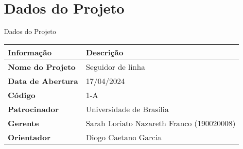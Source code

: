 \section{Dados do Projeto}

\begin{quadro}[htb]
  \caption{\label{quadro_dados_projeto}Dados do Projeto}

  \begin{tabular}{|l|l|}
    \hline
    \textbf{Informação} & \textbf{Descrição} \\
    \hline
    \textbf{Nome do Projeto} & Seguidor de linha \\
    \hline
    \textbf{Data de Abertura} & 17/04/2024 \\
    \hline
    \textbf{Código} & 1-A \\
    \hline
    \textbf{Patrocinador} & Universidade de Brasília \\
    \hline
    \textbf{Gerente} & Sarah Loriato Nazareth Franco (190020008) \\
    \hline
    \textbf{Orientador} & Diogo Caetano Garcia \\
    \hline
  \end{tabular}

\end{quadro}
